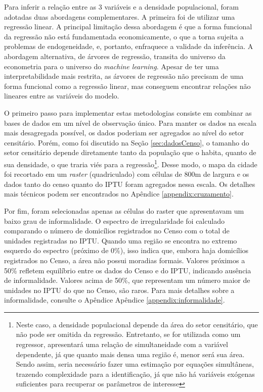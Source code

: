 Para inferir a relação entre as 3 variáveis e a densidade populacional, foram adotadas duas abordagens complementares. A primeira foi de utilizar uma regressão linear. A principal limitação dessa abordagem é que a forma funcional da regressão não está fundamentada economicamente, o que a torna sujeita a problemas de endogeneidade, e, portanto, enfraquece a validade da inferência. A abordagem alternativa, de árvores de regressão, transita do universo da econometria para o universo do \textit{machine learning}. Apesar de ter uma interpretabilidade mais restrita, as árvores de regressão não precisam de uma forma funcional como a regressão linear, mas conseguem encontrar relações não lineares entre as variáveis do modelo.

O primeiro passo para implementar estas metodologias consiste em combinar as bases de dados em um nível de observação único. Para manter os dados na escala mais desagregada possível, os dados poderiam ser agregados ao nível do setor censitário. Porém, como foi discutido na Seção \ref{sec:dadosCenso}, o tamanho do setor censitário depende diretamente tanto da população que o habita, quanto de sua densidade, o que traria viés para a regressão\footnote{Neste caso, a densidade populacional depende da área do setor censitário, que não pode ser omitida da regressão. Entretanto, se for utilizada como um regressor, apresentará uma relação de simultaneidade com a variável dependente, já que quanto mais densa uma região é, menor será sua área. Sendo assim, seria necessário fazer uma estimação por equações simultâneas, trazendo complexidade para a identificação, já que não há variáveis exógenas suficientes para recuperar os parâmetros de interesse}. Desse modo, o mapa da cidade foi recortado em um \textit{raster} (quadriculado) com células de 800m de largura e os dados tanto do censo quanto do IPTU foram agregados nessa escala. Os detalhes mais técnicos podem ser encontrados no Apêndice \ref{appendix:cruzamento}. 

Por fim, foram selecionadas apenas as células do raster que apresentavam um baixo grau de informalidade. O espectro de irregularidade foi calculado comparando o número de domicílios registrados no Censo com o total de unidades registradas no IPTU. Quando uma região se encontra no extremo esquerdo do espectro (próximo de 0\%), isso indica que, embora haja domicílios registrados no Censo, a área não possui moradias formais. Valores próximos a 50\% refletem equilíbrio entre os dados do Censo e do IPTU, indicando ausência de informalidade. Valores acima de 50\%, que representam um número maior de unidades no IPTU do que no Censo, são raros. Para mais detalhes sobre a informalidade, consulte o Apêndice Apêndice \ref{appendix:informalidade}. 

